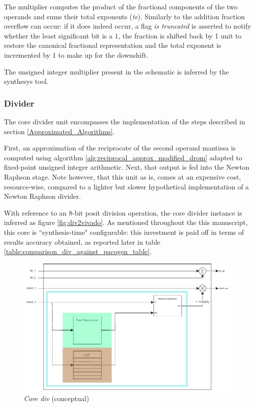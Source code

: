 The multiplier computes the product of the fractional components of the two operands and sums their total exponents (\textit{te}). Similarly to the addition fraction overflow can occur: if it does indeed occur, a flag \textit{is truncated} is asserted to notify whether the least significant bit is a $1$, the fraction is shifted back by 1 unit to restore the canonical fractional representation and the total exponent is incremented by 1 to make up for the downshift.

The unsigned integer multiplier present in the schematic is inferred by the synthesys tool. 
%





\subsubsection{Divider}\label{divider_hardware_ppu}


The core divider unit encompasses the implementation of the steps described in section \ref{Approximated_Algorithms}.

First, an approximation of the reciprocate of the second operand mantissa is computed using algorithm \ref{alg:reciprocal_approx_modified_drom} adapted to fixed-point unsigned integer arithmetic.
Next, that output is fed into the Newton Raphson stage.
Note however, that this unit as is, comes at an expensive cost, resource-wise, compared to a lighter but slower hypothetical implementation of a Newton Raphson divider.

With reference to an 8-bit posit division operation, the core divider instance is inferred as figure \ref{fig:div2vivado}. As mentioned throughout the this manuscript, this core is ``synthesis-time" configurable:
this investment is paid off in terms of results accuracy obtained, as reported later in table \ref{table:comparison_div_against_pacogen_table}.

    \begin{figure}
        \includegraphics[width=1\textwidth]{figures/newton_raphson_drawing.drawio.pdf}
        \caption{\textit{Core div} (conceptual)}
        \label{fig:nr_schematic}
    \end{figure}

